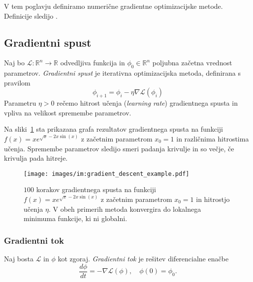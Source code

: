 \documentclass[mat2, tisk]{fmfdelo}
\newcommand{\R}{\mathbb R}
\begin{document}
V tem poglavju definiramo numerične gradientne optimizacijske metode.
Definicije sledijo \cite{prince2023understandingdeeplearning}.
\subsection{Gradientni spust}
\begin{definicija}
  Naj bo $\mathcal{L} \colon \R^n  \to \R$ odvedljiva funkcija in
  $\phi_0 \in \R^n$ poljubna začetna vrednost parametrov.
  \emph{Gradientni spust} je iterativna
  optimizacijska metoda, definirana s pravilom
  \begin{equation}
    \label{eq:gradientni spust}
    \phi_{i+1} = \phi_i - \eta \nabla \mathcal{L}(\phi_i)
  \end{equation}
  Parametru
  $\eta > 0$ rečemo   hitrost učenja (\emph{learning rate})
  gradientnega spusta in vpliva na velikost spremembe parametrov.
\end{definicija}

\begin{primer}
  Na sliki~\ref{fig:primer gradientnega spusta} sta prikazana grafa
  rezultatov gradientnega spusta na funkciji $f(x) = x e^{\sqrt{x} -
  2x\sin(x)}$ z začetnim parametrom $x_0 = 1$ in različnima
  hitrostima učenja. Spremembe parametrov sledijo smeri padanja
  krivulje in so večje, če krivulja pada hitreje.
  \begin{figure}[ht]
    \centering
    \texttt{[image: images/im:gradient\_descent\_example.pdf]}
    \caption[Primer delovanja gradientnega spusta.]{$100$ korakov
      gradientnega spusta na funkciji $f(x) = x e^{\sqrt{x} -
      2x\sin(x)}$ z začetnim parametrom $x_0=1$ in hitrostjo učenja
      $\eta$. V obeh primerih metoda konvergira do lokalnega minimuma
    funkcije, ki ni globalni. }
    \label{fig:primer gradientnega spusta}
  \end{figure}
\end{primer}

\subsubsection{Gradientni tok}
Naj bosta $\mathcal{L}$ in $\phi$ kot zgoraj. \emph{Gradientni tok}
je rešitev diferencialne enačbe
\begin{equation}
  \label{eq:gradient flow}
  \frac{d\phi}{d t} = - \nabla \mathcal{L}(\phi), \quad \phi(0)=\phi_0.
\end{equation}
\end{document}
